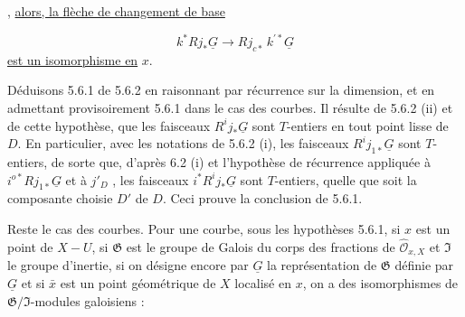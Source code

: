 \begin{center}
\end{center}
,
\underline{alors, la flèche de changement de base}

\begin{equation*}
k^* Rj_*\underline{G} \longrightarrow Rj_{c*}\, k^{\prime *}\underline{G}
\end{equation*}
\underline{est un isomorphisme en} $x$.

Déduisons 5.6.1 de 5.6.2 en raisonnant par récurrence sur la dimension, et en admettant provisoirement 5.6.1 dans le cas des courbes. Il résulte de 5.6.2 (ii) et de cette hypothèse, que les faisceaux $R^i j_*\underline{G}$ sont $T$-entiers en tout point lisse de $D$. En particulier, avec les notations de 5.6.2 (i), les faisceaux $R^i j_{1*}\underline{G}$ sont $T$-entiers, de sorte que, d'après 6.2 (i) et l'hypothèse de récurrence appliquée à $i^{o*} Rj_{1*}\underline{G}$ et à $j'_D$ , les faisceaux $i^* R^i j_*\underline{G}$ sont $T$-entiers, quelle que soit la composante choisie $D'$ de $D$. Ceci prouve la conclusion de 5.6.1.

Reste le cas des courbes. Pour une courbe, sous les hypothèses 5.6.1, si $x$ est un point de $X - U$, si $\mathfrak{G}$ est le groupe de Galois du corps des fractions de $\hat{\mathcal{O}}_{x,X}$ et $\mathfrak{I}$ le groupe d'inertie, si on désigne encore par $\underline{G}$ la représentation de $\mathfrak{G}$ définie par $\underline{G}$ et si $\bar{x}$ est un point géométrique de $X$ localisé en $x$, on a des isomorphismes de $\mathfrak{G}/\mathfrak{I}$-modules galoisiens :

